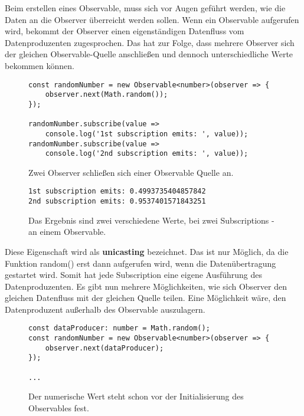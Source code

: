 \noindent
Beim erstellen eines Observable, muss sich vor Augen geführt werden, wie die Daten an die Observer überreicht werden sollen. Wenn ein Observable aufgerufen wird, bekommt der Observer einen eigenständigen Datenfluss vom Datenproduzenten zugesprochen. Das hat zur Folge, dass mehrere Observer sich der gleichen Observable-Quelle anschließen und dennoch unterschiedliche Werte bekommen können.

\begin{figure}[H]
\begin{lstlisting}[basicstyle=\small]
const randomNumber = new Observable<number>(observer => {
    observer.next(Math.random());
});

randomNumber.subscribe(value =>
    console.log('1st subscription emits: ', value));
randomNumber.subscribe(value =>
    console.log('2nd subscription emits: ', value));
\end{lstlisting}
\caption{Zwei Observer schließen sich einer Observable Quelle an.}
\end{figure}

\begin{figure}[H]
\begin{lstlisting}
1st subscription emits: 0.4993735404857842
2nd subscription emits: 0.9537401571843251
\end{lstlisting}
\caption{Das Ergebnis sind zwei verschiedene Werte, bei zwei Subscriptions - an einem Observable.}
\end{figure}

\noindent
Diese Eigenschaft wird als \textbf{unicasting} bezeichnet. Das ist nur Möglich, da die Funktion random() erst dann aufgerufen wird, wenn die Datenübertragung gestartet wird. Somit hat jede Subscription eine eigene Ausführung des Datenproduzenten. Es gibt nun mehrere Möglichkeiten, wie sich Observer den gleichen Datenfluss mit der gleichen Quelle teilen. Eine Möglichkeit wäre, den Datenproduzent außerhalb des Observable auszulagern. 

\begin{figure}[H]
\begin{lstlisting}[basicstyle=\small]
const dataProducer: number = Math.random();
const randomNumber = new Observable<number>(observer => {
    observer.next(dataProducer);
});

...
\end{lstlisting}
\caption{Der numerische Wert steht schon vor der Initialisierung des Observables fest.}
\end{figure}


